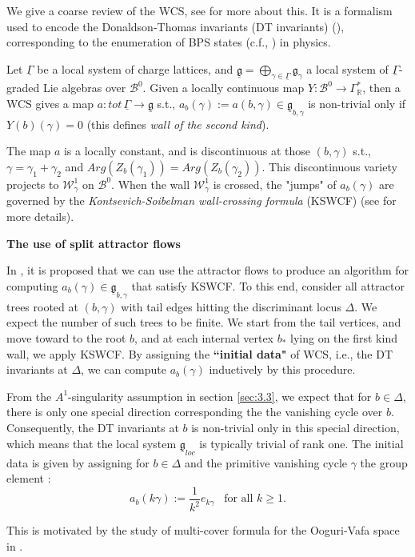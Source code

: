 \documentclass{article}
\begin{document}
We give a coarse review of the WCS, see \cite{kontsevich2014wall}\cite{wang2020wall} for more about this. It is a formalism used to encode the Donaldson-Thomas invariants (DT invariants) (\cite{kontsevich2008stability}), corresponding to the enumeration of BPS states (c.f., \cite{denef2011split}\cite{wotschke2013bps}\cite{moore2012lecture}) in physics. 

Let $\underline{\Gamma}$ be a local system of charge lattices, and $\underline{\mathfrak{g}}=\bigoplus_{\gamma\in\underline{\Gamma}}\mathfrak{g}_{\gamma}$ a local system of $\underline{\Gamma}$-graded Lie algebras over $\mathcal{B}^{0}$. Given a locally continuous map $Y:\mathcal{B}^{0}\to\Gamma_{\mathbb{R}}^{*}$, then a WCS gives a map $a: tot\,\underline{\Gamma}\to\underline{\mathfrak{g}}$ s.t., $a_{b}(\gamma):=a(b,\gamma)\in\underline{\mathfrak{g}}_{b,\gamma}$ is non-trivial only if $Y(b)(\gamma)=0$ (this defines \textit{wall of the second kind}). 

The map $a$ is a locally constant, and is discontinuous at those $(b,\gamma)$ s.t., $\gamma=\gamma_{1}+\gamma_{2}$ and $Arg (Z_{b}(\gamma_{1}))=Arg(Z_{b}(\gamma_{2}))$. This discontinuous variety projects to $\mathcal{W}^{1}_{\gamma}$ on $\mathcal{B}^{0}$. When the wall $\mathcal{W}^{1}_{\gamma}$ is crossed, the "jumps" of $a_{b}(\gamma)$ are governed by the \textit{Kontsevich-Soibelman wall-crossing formula} (KSWCF) (see \cite{kontsevich2008stability} for more details).

\textbf{The use of split attractor flows}

In \cite{kontsevich2014wall}, it is proposed that we can use the attractor flows to produce an algorithm for computing $a_{b}(\gamma)\in\underline{\mathfrak{g}}_{b,\gamma}$ that satisfy KSWCF. To this end, consider all attractor trees rooted at $(b,\gamma)$ with tail edges hitting the discriminant locus $\Delta$. We expect the number of such trees to be finite. We start from the tail vertices, and move toward to the root $b$, and at each internal vertex $b_{*}$ lying on the first kind wall, we apply KSWCF. By assigning the \textbf{``initial data"} of WCS, i.e., the DT invariants at $\Delta$, we can compute $a_{b}(\gamma)$ inductively by this procedure.

\begin{remark}
From the $A^{1}$-singularity assumption in section \ref{sec:3.3}, we expect that for $b\in\Delta$, there  is only one special direction corresponding the the vanishing cycle over $b$. Consequently, the DT invariants at $b$ is non-trivial only in this special direction, which means that the local system $\underline{\mathfrak{g}}_{loc}$ is typically trivial of rank one. The initial data is given by assigning for $b\in\Delta$ and the primitive vanishing cycle $\gamma$ the group element \cite{kontsevich2014wall}: \[a_{b}(k\gamma):=\frac{1}{k^{2}}e_{k\gamma}\,\,\,\,\,\text{for all}\,\, k\geq 1.\]

This is motivated by the study of multi-cover formula for the Ooguri-Vafa space in \cite{lin2017open}.
\end{remark}
\end{document}
